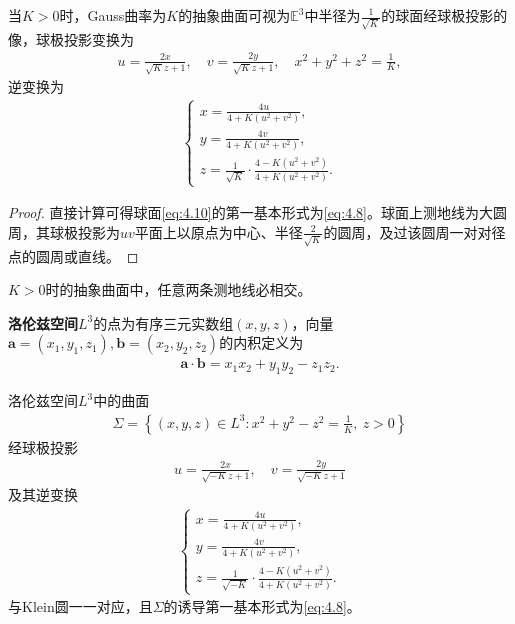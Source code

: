 \documentclass[../../main.tex]{subfiles}%
\begin{document}
\begin{proposition}
当$K>0$时，Gauss曲率为$K$的抽象曲面可视为$\mathbb{E}^3$中半径为$\frac{1}{\sqrt{K}}$的球面经球极投影的像，球极投影变换为
\begin{align}
u=\frac{2x}{\sqrt{K}z+1},\quad v=\frac{2y}{\sqrt{K}z+1},\quad x^2+y^2+z^2=\frac{1}{K},\label{eq:4.9}
\end{align}
逆变换为
\begin{align}
\begin{cases}
x=\frac{4u}{4+K(u^2+v^2)},\\
y=\frac{4v}{4+K(u^2+v^2)},\\
z=\frac{1}{\sqrt{K}}\cdot\frac{4-K(u^2+v^2)}{4+K(u^2+v^2)}.
\end{cases}\label{eq:4.10}
\end{align}
\end{proposition}

\begin{proof}

直接计算可得球面\eqref{eq:4.10}的第一基本形式为\eqref{eq:4.8}。球面上测地线为大圆周，其球极投影为$uv$平面上以原点为中心、半径$\frac{2}{\sqrt{K}}$的圆周，及过该圆周一对对径点的圆周或直线。

\end{proof}

\begin{remark}
$K>0$时的抽象曲面中，任意两条测地线必相交。
\end{remark}

\begin{definition}
\textbf{洛伦兹空间}$L^3$的点为有序三元实数组$(x,y,z)$，向量$\bm{a}=(x_1,y_1,z_1),\bm{b}=(x_2,y_2,z_2)$的内积定义为
\begin{align}
\bm{a}\cdot\bm{b}=x_1x_2+y_1y_2-z_1z_2.\label{eq:4.11}
\end{align}
\end{definition}

\begin{proposition}
洛伦兹空间$L^3$中的曲面
\begin{align}
\Sigma=\left\{(x,y,z)\in L^3:x^2+y^2-z^2=\frac{1}{K},\ z>0\right\}\label{eq:4.12}
\end{align}
经球极投影
\begin{align}
u=\frac{2x}{\sqrt{-K}z+1},\quad v=\frac{2y}{\sqrt{-K}z+1}\label{eq:4.13}
\end{align}
及其逆变换
\begin{align}
\begin{cases}
x=\frac{4u}{4+K(u^2+v^2)},\\
y=\frac{4v}{4+K(u^2+v^2)},\\
z=\frac{1}{\sqrt{-K}}\cdot\frac{4-K(u^2+v^2)}{4+K(u^2+v^2)}.
\end{cases}\label{eq:4.14}
\end{align}
与Klein圆一一对应，且$\Sigma$的诱导第一基本形式为\eqref{eq:4.8}。
\end{proposition}
\end{document}
